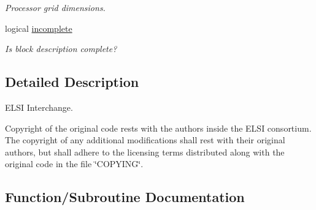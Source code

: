 \begin{DoxyCompactItemize}
\begin{DoxyCompactList}\small\item\em Processor grid dimensions. \end{DoxyCompactList}\item 
\hypertarget{namespacehdf5__tools_adf2df1e36a8daa71e328d9988ea3e6c3}{}logical \hyperlink{namespacehdf5__tools_adf2df1e36a8daa71e328d9988ea3e6c3}{incomplete}\label{namespacehdf5__tools_adf2df1e36a8daa71e328d9988ea3e6c3}

\begin{DoxyCompactList}\small\item\em Is block description complete? \end{DoxyCompactList}\end{DoxyCompactItemize}


\subsection{Detailed Description}
E\+L\+S\+I Interchange. 

Copyright of the original code rests with the authors inside the E\+L\+S\+I consortium. The copyright of any additional modifications shall rest with their original authors, but shall adhere to the licensing terms distributed along with the original code in the file \char`\"{}\+C\+O\+P\+Y\+I\+N\+G\char`\"{}. 

\subsection{Function/\+Subroutine Documentation}
\hypertarget{namespacehdf5__tools_a3d610b11f1a3ae2bfa4ac30391fa9d4e}{}
